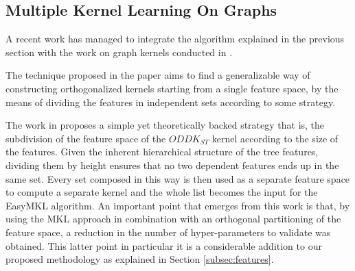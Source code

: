 \subsection{Multiple Kernel Learning On Graphs}
\label{subsec:gmkl}
A recent work \cite{gmkl} has managed to integrate the algorithm explained in the
previous section with the work on graph kernels conducted in \cite{DBLP:conf/sdm/MartinoNS12}.

The technique proposed in the paper aims to find a generalizable way of constructing
orthogonalized kernels starting from a single feature space, by the means of 
dividing the features in independent sets according to some strategy.

The work in \cite{gmkl} proposes a simple yet theoretically backed strategy that is,
the subdivision of the feature space of the $ODDK_{ST}$ kernel according to the
size of the features.
Given the inherent hierarchical structure of the tree features, dividing them by
height ensures that no two dependent features ends up in the same set.
Every set composed in this way is then used as a separate feature space to compute
a separate kernel and the whole list becomes the input for the EasyMKL algorithm.
An important point that emerges from this work is that, by using the MKL approach
in combination with an orthogonal partitioning of the feature space, a reduction
in the number of hyper-parameters to validate was obtained.
This latter point in particular it is a considerable addition to our proposed
methodology as explained in Section \ref{subsec:features}.


